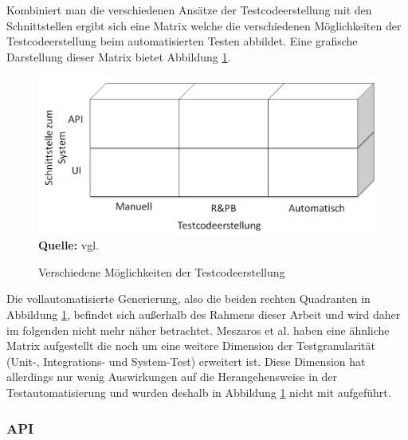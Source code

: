 Kombiniert man die verschiedenen Ansätze der Testcodeerstellung mit den Schnittstellen ergibt sich eine Matrix welche die verschiedenen Möglichkeiten der Testcodeerstellung beim automatisierten Testen abbildet. Eine grafische Darstellung dieser Matrix bietet Abbildung \ref{fig:bereicheTestcodeerstellung}.


\begin{figure}[htb]
  \centering  
  \includegraphics[scale=0.7]{img/bereicheTestcodeerstellung.png}\\
  \footnotesize\sffamily\textbf{Quelle:} vgl. \cite{meszaros_agile_2003}
  \caption{Verschiedene Möglichkeiten der Testcodeerstellung}
  \label{fig:bereicheTestcodeerstellung}
\end{figure}

Die vollautomatisierte Generierung, also die beiden rechten Quadranten in Abbildung \ref{fig:bereicheTestcodeerstellung}, befindet sich außerhalb des Rahmens dieser Arbeit und wird daher im folgenden nicht mehr näher betrachtet.
Meszaros et al. \cite{meszaros_agile_2003} haben eine ähnliche Matrix aufgestellt die noch um eine weitere Dimension der Testgranularität (Unit-, Integrations- und System-Test) erweitert ist. Diese Dimension hat allerdings nur wenig Auswirkungen auf die Herangehensweise in der Testautomatisierung und wurden deshalb in Abbildung \ref{fig:bereicheTestcodeerstellung} nicht mit aufgeführt.

\subsubsection{API}
\label{subsubsec:API}

